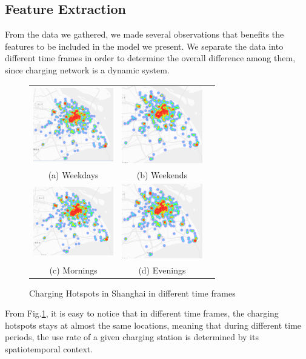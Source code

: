 \documentclass[conference]{IEEEtran}
\begin{document}
\subsection{Feature Extraction}
From the data we gathered, we made several observations that benefits the features to be included in the model we present. We separate the data into different time frames in order to determine the overall difference among them, since charging network is a dynamic system.
\begin{figure}
	\begin{tabular}{ccc}
		\includegraphics[width=35mm]{weekday.pdf} &  \includegraphics[width=35mm]{weekend.pdf} \\
		(a) Weekdays & (b) Weekends \\[6pt] 
		\includegraphics[width=35mm]{morning.pdf} &
		\includegraphics[width=35mm]{evening.pdf} \\
		(c) Mornings & (d) Evenings
	\end{tabular}
	\centering
	\caption{Charging Hotspots in Shanghai in different time frames}
	\label{fig1}
\end{figure}
From Fig.\ref{fig1}, it is easy to notice that in different time frames, the charging hotspots stays at almost the same locations, meaning that during different time periods, the use rate of a given charging station is determined by its spatiotemporal context.
\end{document}

